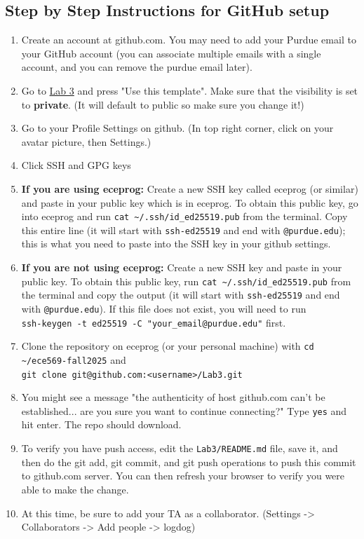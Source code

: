 \documentclass{article}
\numberwithin{figure}{section}
\begin{document}
\subsection*{Step by Step Instructions for GitHub setup}
\begin{enumerate}
\item Create an account at github.com. You may need to add your Purdue email to your GitHub account (you can associate multiple emails with a single account, and you can remove the purdue email later).
\item Go to \href{https://github.com/purdue-ece569-fall2025/Lab3}{Lab 3} and press "Use this template". Make sure that the visibility is set to \textbf{private}. (It will default to public so make sure you change it!)
\item Go to your Profile Settings on github. (In top right corner, click on your avatar picture, then Settings.)
\item Click SSH and GPG keys
\item \textbf{If you are using eceprog: } Create a new SSH key called eceprog (or similar) and paste in your public key which is in eceprog. To obtain this public key, go into eceprog and run \verb|cat ~/.ssh/id_ed25519.pub| from the terminal. Copy this entire line (it will start with \verb|ssh-ed25519| and end with \verb|@purdue.edu|); this is what you need to paste into the SSH key in your github settings.
\item[\theenumi.] \textbf{If you are not using eceprog: } Create a new SSH key and paste in your public key. To obtain this public key, run \verb|cat ~/.ssh/id_ed25519.pub| from the terminal and copy the output (it will start with \verb|ssh-ed25519| and end with \verb|@purdue.edu|). If this file does not exist, you will need to run \\
\verb|ssh-keygen -t ed25519 -C "your_email@purdue.edu"| first.
\item Clone the repository on eceprog (or your personal machine) with \verb|cd ~/ece569-fall2025| and \\ \verb|git clone git@github.com:<username>/Lab3.git|
\item You might see a message "the authenticity of host github.com can't be established... are you sure you want to continue connecting?" Type \verb|yes| and hit enter. The repo should download.
\item To verify you have push access, edit the \verb|Lab3/README.md| file, save it, and then do the git add, git commit, and git push operations to push this commit to github.com server. You can then refresh your browser to verify you were able to make the change.
\item At this time, be sure to add your TA as a collaborator. (Settings -> Collaborators -> Add people -> logdog)
\end{enumerate}
\end{document}
